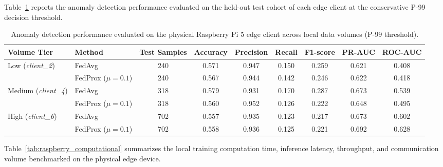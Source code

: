 \documentclass[12pt]{article}
\begin{document}
Table~\ref{tab:raspberry_volume_detection} reports the anomaly detection performance evaluated on the held-out test cohort of each edge client at the conservative P-99 decision threshold.

\begin{table}[t]
	\centering
	\caption{Anomaly detection performance evaluated on the physical Raspberry Pi 5 edge client across local data volumes (P-99 threshold).}
	\label{tab:raspberry_volume_detection}
	\begin{tabular}{llccccccc}
		\toprule
		\textbf{Volume Tier} & \textbf{Method} & \textbf{Test Samples} & \textbf{Accuracy} & \textbf{Precision} & \textbf{Recall} & \textbf{F1-score} & \textbf{PR-AUC} & \textbf{ROC-AUC} \\
		\midrule
		\multirow{2}{*}{Low (\textit{client\_2})}
		& FedAvg              & 240 & 0.571 & 0.947 & 0.150 & 0.259 & 0.621 & 0.408 \\
		& FedProx ($\mu=0.1$) & 240 & 0.567 & 0.944 & 0.142 & 0.246 & 0.622 & 0.418 \\
		\midrule
		\multirow{2}{*}{Medium (\textit{client\_4})}
		& FedAvg              & 318 & 0.579 & 0.931 & 0.170 & 0.287 & 0.673 & 0.539 \\
		& FedProx ($\mu=0.1$) & 318 & 0.560 & 0.952 & 0.126 & 0.222 & 0.648 & 0.495 \\
		\midrule
		\multirow{2}{*}{High (\textit{client\_6})}
		& FedAvg              & 702 & 0.557 & 0.935 & 0.123 & 0.217 & 0.673 & 0.602 \\
		& FedProx ($\mu=0.1$) & 702 & 0.558 & 0.936 & 0.125 & 0.221 & 0.692 & 0.628 \\
		\bottomrule
	\end{tabular}
\end{table}

Table~\ref{tab:raspberry_computational} summarizes the local training computation time, inference latency, throughput, and communication volume benchmarked on the physical edge device.
\end{document}
